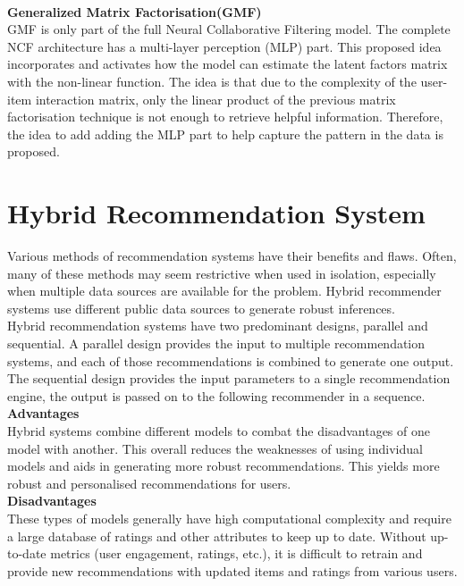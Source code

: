 \\\textbf{Generalized Matrix Factorisation(GMF)}
\\GMF is only part of the full Neural Collaborative Filtering model. The complete NCF architecture has a multi-layer perception (MLP) part. This proposed idea incorporates and activates how the model can estimate the latent factors matrix with the non-linear function. The idea is that due to the complexity of the user-item interaction matrix, only the linear product of the previous matrix factorisation technique is not enough to retrieve helpful information. Therefore, the idea to add adding the MLP part to help capture the pattern in the data is proposed.


\section{Hybrid Recommendation System}
Various methods of recommendation systems have their benefits and flaws. Often, many of these methods may seem restrictive when used in isolation, especially when multiple data sources are available for the problem. Hybrid recommender systems use different public data sources to generate robust inferences.
\\Hybrid recommendation systems have two predominant designs, parallel and sequential. A parallel design provides the input to multiple recommendation systems, and each of those recommendations is combined to generate one output. 
The sequential design provides the input parameters to a single recommendation engine, the output is passed on to the following recommender in a sequence.
\\\textbf{Advantages}
\\Hybrid systems combine different models to combat the disadvantages of one model with another. This overall reduces the weaknesses of using individual models and aids in generating more robust recommendations. This yields more robust and personalised recommendations for users.
\\\textbf{Disadvantages}
\\These types of models generally have high computational complexity and require a large database of ratings and other attributes to keep up to date. 
Without up-to-date metrics (user engagement, ratings, etc.), it is difficult to retrain and provide new recommendations with updated items and ratings from various users.

